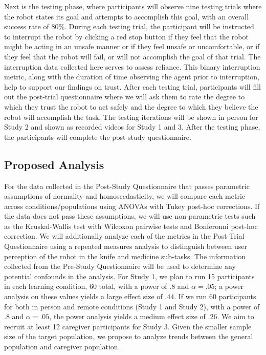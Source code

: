 \documentclass[letterpaper]{article} %
\begin{document}
Next is the testing phase, where participants will observe nine testing trials where the robot states its goal and attempts to accomplish this goal, with an overall success rate of 80\%. During each testing trial, the participant will be instructed to interrupt the robot by clicking a red stop button if they feel that the robot might be acting in an unsafe manner or if they feel unsafe or uncomfortable, or if they feel that the robot will fail, or will not accomplish the goal of that trial. The interruption data collected here serves to assess reliance. This binary interruption metric, along with the duration of time observing the agent prior to interruption, help to support our findings on trust. After each testing trial, participants will fill out the post-trial questionnaire where we will ask them to rate the degree to which they trust the robot to act safely and the degree to which they believe the robot will accomplish the task. The testing iterations will be shown in person for Study 2 and shown as recorded videos for Study 1 and 3. After the testing phase, the participants will complete the post-study questionnaire.

\vspace{-3.17mm}
\subsection{Proposed Analysis}
For the data collected in the Post-Study Questionnaire that passes parametric assumptions of normality and homoscedasticity, we will compare each metric across conditions/populations using ANOVAs with Tukey post-hoc corrections. If the data does not pass these assumptions, we will use non-parametric tests such as the Kruskal-Wallis test with Wilcoxon pairwise tests and Bonferonni post-hoc correction. We will additionally analyze each of the metrics in the Post-Trial Questionnaire using a repeated measures analysis to distinguish between user perception of the robot in the knife and medicine sub-tasks. The information collected from the Pre-Study Questionnaire will be used to determine any potential confounds in the analysis. For Study 1, we plan to run 15 participants in each learning condition, 60 total, with a power of $.8$ and $\alpha=.05$; a power analysis on these values yields a large effect size of $.44$. If we run 60 participants for both in person and remote conditions (Study 1 and Study 2), with a power of $.8$ and $\alpha=.05$, the power analysis yields a medium effect size of $.26$. We aim to recruit at least 12 caregiver participants for Study 3. Given the smaller sample size of the target population, we propose to analyze trends between the general population and caregiver population.
\end{document}
